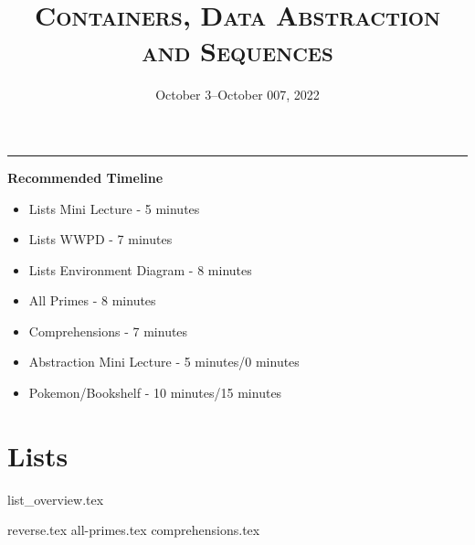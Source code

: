 \documentclass{exam}
\title{\textsc{Containers, Data Abstraction and Sequences}}
\date{October 3--October 007, 2022}
\begin{document}
\maketitle
\rule{\textwidth}{0.15em}
\fontsize{12}{15}\selectfont


\begin{guide}
    \textbf{Recommended Timeline}
    \begin{itemize}
        \item Lists Mini Lecture - 5 minutes
        \item Lists WWPD - 7 minutes
        \item Lists Environment Diagram - 8 minutes
        \item All Primes - 8 minutes
        \item Comprehensions - 7 minutes
        \item Abstraction Mini Lecture - 5 minutes/0 minutes
        \item Pokemon/Bookshelf - 10 minutes/15 minutes
    \end{itemize}
\end{guide}

\section{Lists}
{list_overview.tex}
\begin{questions}
    {reverse.tex}
    \newpage %
    {all-primes.tex}
    {comprehensions.tex}
\end{questions}

\newpage
\end{document}
